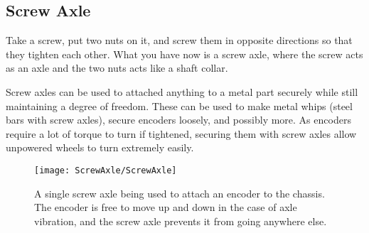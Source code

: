 ﻿\subsection{Screw Axle}

Take a screw, put two nuts on it, and screw them in opposite directions so that they tighten each other. What you have now is a screw axle, where the screw acts as an axle and the two nuts acts like a shaft collar.

Screw axles can be used to attached anything to a metal part securely while still maintaining a degree of freedom. These can be used to make metal whips (steel bars with screw axles), secure encoders loosely, and possibly more. As encoders require a lot of torque to turn if tightened, securing them with screw axles allow unpowered wheels to turn extremely easily.

\begin{figure}[h]
    \centering
    \texttt{[image: ScrewAxle/ScrewAxle]}
    \caption{
        A single screw axle being used to attach an encoder to the chassis. The encoder is free to move up and down in the case of axle vibration, and the screw axle prevents it from going anywhere else.
    }
\end{figure}

